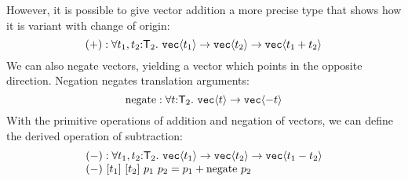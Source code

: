 However, it is possible to give vector addition a more precise type
that shows how it is variant with change of origin:
\begin{displaymath}
  (+) : \forall t_1, t_2 \mathord: \SynTransl_2.\ \tyPrim{vec}{t_1} \to \tyPrim{vec}{t_2} \to \tyPrim{vec}{t_1 + t_2}
\end{displaymath}
We can also negate vectors, yielding a vector which points in the
opposite direction. Negation negates translation arguments:
\begin{displaymath}
  \mathrm{negate} : \forall t \mathord: \mathsf{T}_2.\ \texttt{vec}\langle t \rangle \to \texttt{vec}\langle -t \rangle
\end{displaymath}
With the primitive operations of addition and negation of vectors, we
can define the derived operation of subtraction:
\begin{displaymath}
  \begin{array}{l}
    (-) : \forall t_1,t_2 \mathord:\mathsf{T}_2.\ \texttt{vec}\langle t_1 \rangle \to \texttt{vec}\langle t_2 \rangle \to \texttt{vec}\langle t_1 - t_2 \rangle \\
    (-)\ [t_1]\ [t_2]\ p_1\ p_2 = p_1 + \mathrm{negate}\ p_2
  \end{array}
\end{displaymath}

